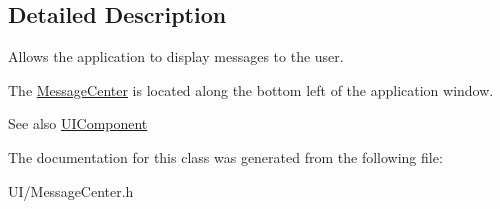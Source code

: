 \subsection{Detailed Description}
Allows the application to display messages to the user.

The \hyperlink{classMessageCenter}{Message\-Center} is located along the bottom left of the application window.

\begin{DoxySeeAlso}{See also}
\hyperlink{classUIComponent}{U\-I\-Component} 
\end{DoxySeeAlso}


The documentation for this class was generated from the following file\-:\begin{DoxyCompactItemize}
\item 
U\-I/Message\-Center.\-h\end{DoxyCompactItemize}
